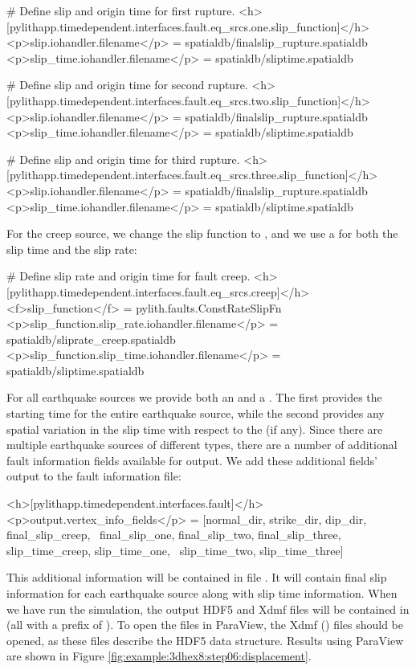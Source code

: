\begin{cfg}
# Define slip and origin time for first rupture.
<h>[pylithapp.timedependent.interfaces.fault.eq_srcs.one.slip_function]</h>
<p>slip.iohandler.filename</p> = spatialdb/finalslip_rupture.spatialdb
<p>slip_time.iohandler.filename</p> = spatialdb/sliptime.spatialdb

# Define slip and origin time for second rupture.
<h>[pylithapp.timedependent.interfaces.fault.eq_srcs.two.slip_function]</h>
<p>slip.iohandler.filename</p> = spatialdb/finalslip_rupture.spatialdb
<p>slip_time.iohandler.filename</p> = spatialdb/sliptime.spatialdb

# Define slip and origin time for third rupture.
<h>[pylithapp.timedependent.interfaces.fault.eq_srcs.three.slip_function]</h>
<p>slip.iohandler.filename</p> = spatialdb/finalslip_rupture.spatialdb
<p>slip_time.iohandler.filename</p> = spatialdb/sliptime.spatialdb
\end{cfg}
For the creep source, we change the slip function to ,
and we use a  for both the slip time and the slip
rate:
\begin{cfg}
# Define slip rate and origin time for fault creep.
<h>[pylithapp.timedependent.interfaces.fault.eq_srcs.creep]</h>
<f>slip_function</f> = pylith.faults.ConstRateSlipFn
<p>slip_function.slip_rate.iohandler.filename</p> = spatialdb/sliprate_creep.spatialdb
<p>slip_function.slip_time.iohandler.filename</p> = spatialdb/sliptime.spatialdb
\end{cfg}
For all earthquake sources we provide both an 
and a . The first provides the starting
time for the entire earthquake source, while the second provides any
spatial variation in the slip time with respect to the 
(if any). Since there are multiple earthquake sources of different
types, there are a number of additional fault information fields available
for output. We add these additional fields' output to the fault information
file:
\begin{cfg}
<h>[pylithapp.timedependent.interfaces.fault]</h>
<p>output.vertex_info_fields</p> = [normal_dir, strike_dir, dip_dir, final_slip_creep, \
  final_slip_one, final_slip_two, final_slip_three, slip_time_creep, slip_time_one, \
  slip_time_two, slip_time_three]
\end{cfg}
This additional information will be contained in file .
It will contain final slip information for each earthquake source
along with slip time information. When we have run the simulation,
the output HDF5 and Xdmf files will be contained in 
(all with a prefix of \filename{step06}). To open the files in ParaView,
the Xdmf (\filename{xmf}) files should be opened, as these files describe
the HDF5 data structure. Results using ParaView are shown in Figure
\vref{fig:example:3dhex8:step06:displacement}.

